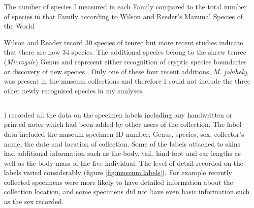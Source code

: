 
\begin{table}[h]
	\caption[Species measured] 
	{The number of species I measured in each Family compared to the total number of species in that Family according to Wilson and Reeder's Mammal Species of the World \citeyear{Wilson2005}}
		
	\label{tab:species.measured}
\end{table}
 
Wilson and Reader \citeyearpar{Wilson2005} record 30 species of tenrec but more recent studies indicate that there are now 34 species\citep{Olson2013}. The additional species belong to the shrew tenrec (\textit{Microgale}) Genus and represent either recognition of cryptic species boundaries \citep{Olson2004} or discovery of new species \citep{Goodman2006, Olson2009}. Only one of these four recent additions, \textit{M. jobihely}, was present in the museum collections and therefore I could not include the three other newly recognised species in my analyses.




\subsection{}

	I recorded all the data on the specimen labels including any handwritten or printed notes which had been added by other users of the collection. The label data included the museum specimen ID number, Genus, species, sex, collector's name, the date and location of collection. Some of the labels attached to skins had additional information such as the body, tail, hind foot and ear lengths as well as the body mass of the live individual. 
	The level of detail recorded on the labels varied considerably (figure \ref{fig:museum.labels}). For example recently collected specimens were more likely to have detailed information about the collection location, and some specimens did not have even basic information such as the sex recorded. 


